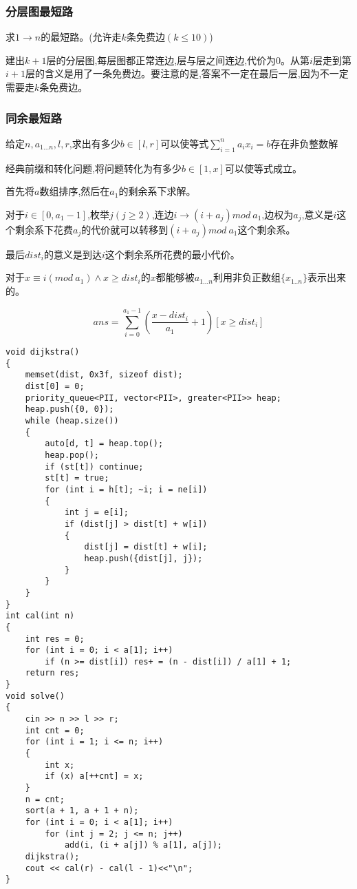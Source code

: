 \documentclass[a4paper,fontset=none]{ctexart}
\begin{document}
\subsubsection{分层图最短路}

求$1\rightarrow n$的最短路。(允许走$k$条免费边$(k\leqslant 10)$)

建出$k+1$层的分层图,每层图都正常连边,层与层之间连边,代价为0。从第$i$层走到第$i+1$层的含义是用了一条免费边。要注意的是,答案不一定在最后一层,因为不一定需要走$k$条免费边。
\subsubsection{同余最短路}

给定$n,a_{1...n},l,r$,求出有多少$b\in [l,r]$可以使等式$\sum\limits_{i=1}^n{a_ix_i}=b$存在非负整数解

经典前缀和转化问题,将问题转化为有多少$b\in [1,x]$可以使等式成立。

首先将$a$数组排序,然后在$a_1$的剩余系下求解。

对于$i\in [0,a_1-1]$,枚举$j(j\ge 2)$,连边$i\rightarrow (i+a_j)mod\ a_1$,边权为$a_j$,意义是$i$这个剩余系下花费$a_j$的代价就可以转移到$(i+a_j)mod\ a_1$这个剩余系。

最后$dist_i$的意义是到达$i$这个剩余系所花费的最小代价。

对于$x\equiv i(mod\ a_1)\wedge x\ge dist_i$的$x$都能够被$a_{1...n}$利用非负正数组$\{x_{1..n}\}$表示出来的。

$$ans=\sum\limits_{i=0}^{a_1-1}{(\frac{x-dist_i}{a_1}+1)[x\geqslant dist_i]}$$


\begin{verbatim}
void dijkstra()
{
    memset(dist, 0x3f, sizeof dist);
    dist[0] = 0;
    priority_queue<PII, vector<PII>, greater<PII>> heap;
    heap.push({0, 0});
    while (heap.size())
    {
        auto[d, t] = heap.top();
        heap.pop();
        if (st[t]) continue;
        st[t] = true;
        for (int i = h[t]; ~i; i = ne[i])
        {
            int j = e[i];
            if (dist[j] > dist[t] + w[i])
            {
                dist[j] = dist[t] + w[i];
                heap.push({dist[j], j});
            }
        }
    }
}
int cal(int n)
{
    int res = 0;
    for (int i = 0; i < a[1]; i++)
        if (n >= dist[i]) res+ = (n - dist[i]) / a[1] + 1;
    return res;
}
void solve()
{
    cin >> n >> l >> r;
    int cnt = 0;
    for (int i = 1; i <= n; i++)
    {
        int x;
        if (x) a[++cnt] = x;
    }
    n = cnt;
    sort(a + 1, a + 1 + n);
    for (int i = 0; i < a[1]; i++)
        for (int j = 2; j <= n; j++)
            add(i, (i + a[j]) % a[1], a[j]);
    dijkstra();
    cout << cal(r) - cal(l - 1)<<"\n";
}
\end{verbatim}
\end{document}
